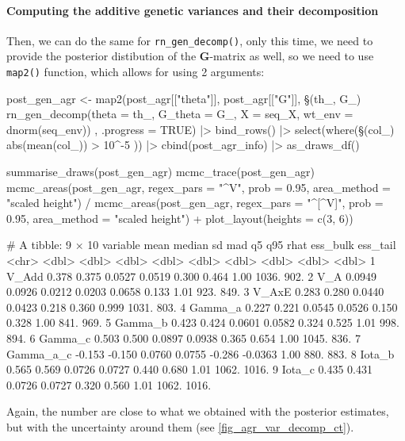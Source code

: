 \documentclass[a4paper,12pt,twoside]{article}
\begin{document}
\paragraph{Computing the additive genetic variances and their decomposition}
Then, we can do the same for \texttt{rn\_gen\_decomp()}, only this time, we need to provide the posterior distibution of the $\mathbf{G}$-matrix as well, so we need to use \texttt{map2()} function, which allows for using 2 arguments:
\begin{Rinput}
post_gen_agr <-
    map2(post_agr[["theta"]], post_agr[["G"]],
     \§§(th_, G_) { rn_gen_decomp(theta = th_,
                                G_theta = G_,
                                X = seq_X,
                                wt_env = dnorm(seq_env)) },
     .progress = TRUE) |>
    bind_rows() |>
    select(where(\§§(col_) { abs(mean(col_)) > 10^-5 })) |>
    cbind(post_agr_info) |>
    as_draws_df()

summarise_draws(post_gen_agr)
mcmc_trace(post_gen_agr)
mcmc_areas(post_gen_agr,
           regex_pars = "^V",
           prob = 0.95,
           area_method = "scaled height") /
    mcmc_areas(post_gen_agr,
               regex_pars = "^[^V]",
               prob = 0.95,
               area_method = "scaled height") +
    plot_layout(heights = c(3, 6))
\end{Rinput}
\begin{Routput}
# A tibble: 9 × 10
  variable     mean  median     sd    mad      q5     q95  rhat ess_bulk ess_tail
  <chr>       <dbl>   <dbl>  <dbl>  <dbl>   <dbl>   <dbl> <dbl>    <dbl>    <dbl>
1 V_Add      0.378   0.375  0.0527 0.0519  0.300   0.464  1.00     1036.     902.
2 V_A        0.0949  0.0926 0.0212 0.0203  0.0658  0.133  1.01      923.     849.
3 V_AxE      0.283   0.280  0.0440 0.0423  0.218   0.360  0.999    1031.     803.
4 Gamma_a    0.227   0.221  0.0545 0.0526  0.150   0.328  1.00      841.     969.
5 Gamma_b    0.423   0.424  0.0601 0.0582  0.324   0.525  1.01      998.     894.
6 Gamma_c    0.503   0.500  0.0897 0.0938  0.365   0.654  1.00     1045.     836.
7 Gamma_a_c -0.153  -0.150  0.0760 0.0755 -0.286  -0.0363 1.00      880.     883.
8 Iota_b     0.565   0.569  0.0726 0.0727  0.440   0.680  1.01     1062.    1016.
9 Iota_c     0.435   0.431  0.0726 0.0727  0.320   0.560  1.01     1062.    1016.
\end{Routput}
Again, the number are close to what we obtained with the posterior estimates, but with the uncertainty around them (see \autoref{fig_agr_var_decomp_ct}).
\end{document}
